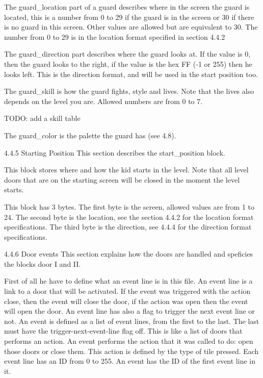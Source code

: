  The guard_location part of a guard describes where in the screen the guard
 is located, this is a number from 0 to 29 if the guard is in the screen or
 30 if there is no guard in this screen. Other values are allowed but are
 equivalent to 30. The number from 0 to 29 is in the location format
 specified in section 4.4.2
 
 The guard_direction part describes where the guard looks at. If the value
 is 0, then the guard looks to the right, if the value is the hex FF (-1 or
 255) then he looks left. This is the direction format, and will be used in
 the start position too.

 The guard_skill is how the guard fights, style and lives. Note that the
 lives also depends on the level you are. Allowed numbers are from 0 to 7.

 TODO: add a skill table

 The guard_color is the palette the guard has (see 4.8).

4.4.5 Starting Position
 This section describes the start_position block.
 
 This block stores where and how the kid starts in the level. Note that all
 level doors that are on the starting screen will be closed in the moment
 the level starts.
 
 This block has 3 bytes.
 The first byte is the screen, allowed values are from 1 to 24.
 The second byte is the location, see the section 4.4.2 for the location
 format specifications.
 The third byte is the direction, see 4.4.4 for the direction format
 specifications.

4.4.6 Door events 
 This section explains how the doors are handled and speficies the blocks
 door I and II.

 First of all he have to define what an event line is in this file. An event
 line is a link to a door that will be activated. If the event was triggered
 with the action close, then the event will close the door, if the action
 was open then the event will open the door. An event line has also a flag
 to trigger the next event line or not.
 An event is defined as a list of event lines, from the first to the last.
 The last must have the trigger-next-event-line flag off. This is like a
 list of doors that performs an action.
 An event performs the action that it was called to do: open those doors or
 close them. This action is defined by the type of tile pressed.
 Each event line has an ID from 0 to 255. An event has the ID of the first
 event line in it.

